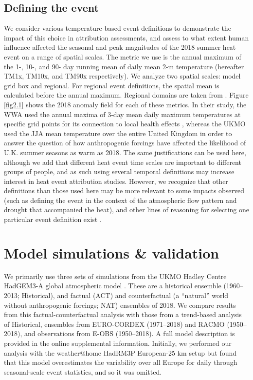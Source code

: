 \subsection{Defining the event}

  We consider various temperature-based event definitions to demonstrate the impact of this choice in attribution assessments, and assess to what extent human influence affected the seasonal and peak magnitudes of the 2018 summer heat event on a range of spatial scales. The metric we use is the annual maximum of the 1-, 10-, and 90- day running mean of daily mean 2-m temperature (hereafter TM1x, TM10x, and TM90x respectively). We analyze two spatial scales: model grid box and regional. For regional event definitions, the spatial mean is calculated before the annual maximum. Regional domains are taken from \citet{christensen_summary_2007}. Figure \ref{fig2.1} shows the 2018 anomaly field for each of these metrics. In their study, the WWA used the annual maxima of 3-day mean daily maximum temperatures at specific grid points for its connection to local health effects \citep{dippoliti_impact_2010}, whereas the UKMO used the JJA mean temperature over the entire United Kingdom in order to answer the question of how anthropogenic forcings have affected the likelihood of U.K. summer seasons as warm as 2018. The same justifications can be used here, although we add that different heat event time scales are important to different groups of people, and as such using several temporal definitions may increase interest in heat event attribution studies. However, we recognize that other definitions than those used here may be more relevant to some impacts observed (such as defining the event in the context of the atmospheric flow pattern and drought that accompanied the heat), and other lines of reasoning for selecting one particular event definition exist \citep{cattiaux_defining_2018}.

\section{Model simulations \& validation}

  We primarily use three sets of simulations from the UKMO Hadley Centre HadGEM3-A global atmospheric model \citep{christidis_new_2013,ciavarella_upgrade_2018}. These are a historical ensemble (1960--2013; Historical), and factual (ACT) and counterfactual (a “natural” world without anthropogenic forcings; NAT) ensembles of 2018. We compare results from this factual-counterfactual analysis with those from a trend-based analysis of Historical, ensembles from EURO-CORDEX \citep{vautard_simulation_2013,jacob_euro-cordex_2014,vrac_influence_2017} (1971--2018) and RACMO \citep{aalbers_local-scale_2018,lenderink_preparing_2014} (1950--2018), and observations from E-OBS (1950--2018). A full model description is provided in the online supplemental information. Initially, we performed our analysis with the weather@home HadRM3P European-25 km setup \citep{massey_weatherhome-development_2015} but found that this model overestimates the variability over all Europe for daily through seasonal-scale event statistics, and so it was omitted.

